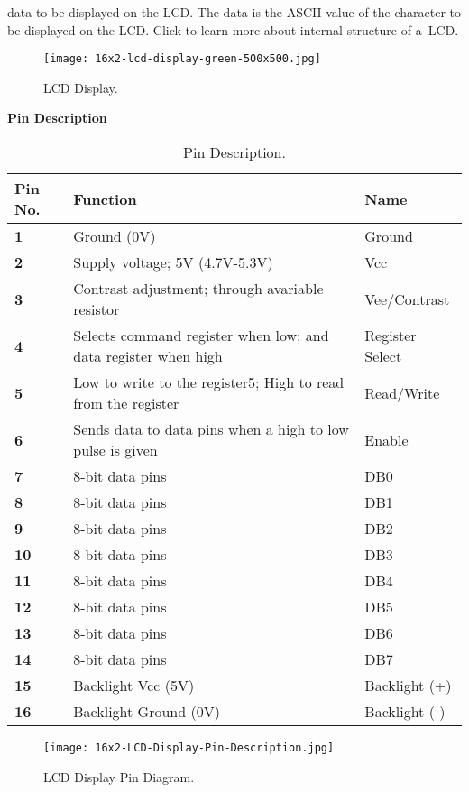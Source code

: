 data to be displayed on the LCD. The data is the ASCII value of the character to be
displayed on the LCD. Click to learn more about internal structure of a LCD.

\begin{figure}[h]
	\centering
	\texttt{[image: 16x2-lcd-display-green-500x500.jpg]}
	\caption{LCD Display.}
\end{figure}
\pagebreak
\textbf{Pin Description}

\begin{table}[h]
	\begin{center}
		
		\begin{tabular}{l|l|l} 
			\textbf{Pin No.} & \textbf{Function} & \textbf{Name} \\
			\hline
			\textbf{1} & Ground (0V) & Ground\\
			\textbf{2} & Supply voltage; 5V (4.7V-5.3V) & Vcc\\
			\textbf{3} & Contrast adjustment; through avariable resistor &Vee/Contrast \\
			\textbf{4} & Selects command register when low; and data register when high &Register Select \\
			\textbf{5} &Low to write to the register5; High to read from the register  &Read/Write \\
			\textbf{6} & Sends data to data pins when a high to low pulse is given & Enable\\
			\textbf{7} & 8-bit data pins &DB0 \\
			\textbf{8} & 8-bit data pins &DB1 \\
			\textbf{9} & 8-bit data pins &DB2 \\
			\textbf{10} & 8-bit data pins &DB3 \\
			\textbf{11} & 8-bit data pins &DB4 \\
			\textbf{12} & 8-bit data pins &DB5 \\
			\textbf{13} & 8-bit data pins &DB6 \\
			\textbf{14} & 8-bit data pins &DB7 \\
			\textbf{15} & Backlight Vcc (5V) &Backlight (+) \\
			\textbf{16} & Backlight Ground (0V) &Backlight (-) \\
			
		\end{tabular}
		\caption{Pin Description.}
	\end{center}
\end{table}
\begin{figure}[h]
	\centering
	\texttt{[image: 16x2-LCD-Display-Pin-Description.jpg]}
	\caption{LCD Display Pin Diagram.}
\end{figure}



